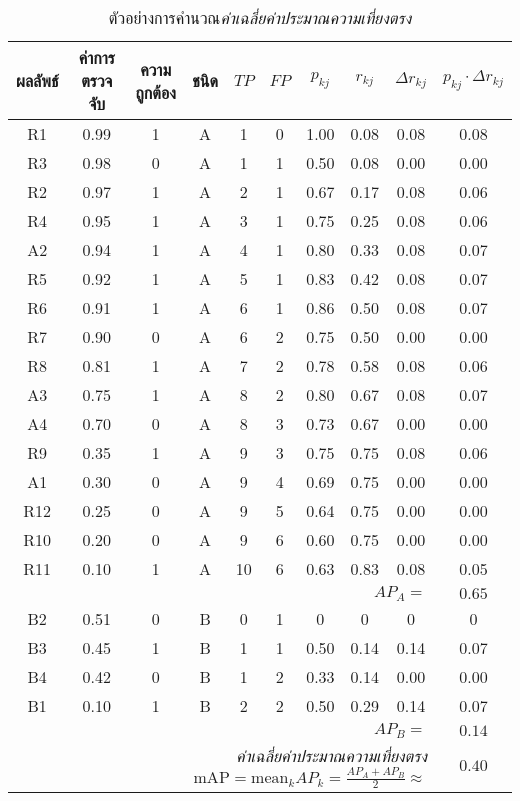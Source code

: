 \begin{table}
	\caption[ค่าเฉลี่ยค่าประมาณความเที่ยงตรง]{ตัวอย่างการคำนวณ\textit{ค่าเฉลี่ยค่าประมาณความเที่ยงตรง}}
	\begin{center}
\begin{tabular}{|c|c|c|c|c|c|c|c|c|c|}
	\hline 
	ผลลัพธ์ & ค่าการตรวจจับ & ความถูกต้อง & ชนิด & $TP$ & $FP$ & $p_{kj}$ & $r_{kj}$ & $\Delta r_{kj}$ & $p_{kj} \cdot \Delta r_{kj}$ \\
	\hline 
	R1 & 0.99 & 1 & A & 1 & 0 & 1.00 & 0.08 & 0.08 & 0.08 \\
	R3 & 0.98 & 0 & A & 1 & 1 & 0.50 & 0.08 & 0.00 & 0.00 \\
	R2 & 0.97 & 1 & A & 2 & 1 & 0.67 & 0.17 & 0.08 & 0.06 \\
	R4 & 0.95 & 1 & A & 3 & 1 & 0.75 & 0.25 & 0.08 & 0.06 \\
	A2 & 0.94 & 1 & A & 4 & 1 & 0.80 & 0.33 & 0.08 & 0.07 \\
	R5 & 0.92 & 1 & A & 5 & 1 & 0.83 & 0.42 & 0.08 & 0.07 \\
	R6 & 0.91 & 1 & A & 6 & 1 & 0.86 & 0.50 & 0.08 & 0.07 \\
	R7 & 0.90 & 0 & A & 6 & 2 & 0.75 & 0.50 & 0.00 & 0.00 \\
	R8 & 0.81 & 1 & A & 7 & 2 & 0.78 & 0.58 & 0.08 & 0.06 \\
	A3 & 0.75 & 1 & A & 8 & 2 & 0.80 & 0.67 & 0.08 & 0.07 \\
	A4 & 0.70 & 0 & A & 8 & 3 & 0.73 & 0.67 & 0.00 & 0.00 \\
	R9 & 0.35 & 1 & A & 9 & 3 & 0.75 & 0.75 & 0.08 & 0.06 \\
	A1 & 0.30 & 0 & A & 9 & 4 & 0.69 & 0.75 & 0.00 & 0.00 \\
	R12 & 0.25 & 0 & A & 9 & 5 & 0.64 & 0.75 & 0.00 & 0.00 \\
	R10 & 0.20 & 0 & A & 9 & 6 & 0.60 & 0.75 & 0.00 & 0.00 \\
	R11 & 0.10 & 1 & A & 10 & 6 & 0.63 & 0.83 & 0.08 & 0.05 \\
	\hline
	\multicolumn{9}{|r|}{$AP_A = $} & $0.65$ \\
	\hline 
	B2 & 0.51 & 0 & B & 0 & 1 & 0 & 0 & 0 & 0 \\
	B3 & 0.45 & 1 & B & 1 & 1 & 0.50 & 0.14 & 0.14 & 0.07 \\
	B4 & 0.42 & 0 & B & 1 & 2 & 0.33 & 0.14 & 0.00 & 0.00 \\
	B1 & 0.10 & 1 & B & 2 & 2 & 0.50 & 0.29 & 0.14 & 0.07 \\
	\hline
	\multicolumn{9}{|r|}{$AP_B = $} & $0.14$ \\
	\hline 
	\multicolumn{9}{|r|}{\textit{ค่าเฉลี่ยค่าประมาณความเที่ยงตรง} $\mathrm{mAP} = \mathrm{mean}_k AP_k = \frac{AP_A + AP_B}{2} \approx $} & $0.40$ \\
	\hline 
\end{tabular} 
\end{center}
	\label{tbl: mAP Example}
\end{table}

